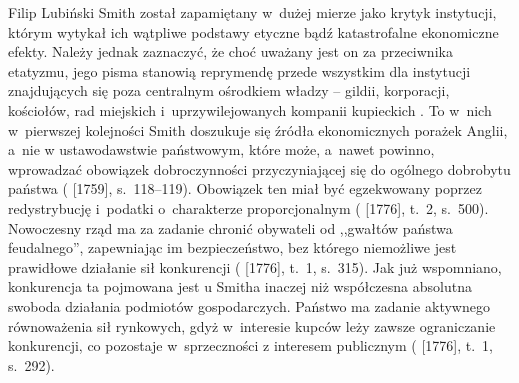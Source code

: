 \begin{artplenv}{Filip Lubiński}
Smith został zapamiętany w~dużej mierze jako krytyk instytucji, którym wytykał ich wątpliwe podstawy etyczne bądź
katastrofalne ekonomiczne efekty. Należy jednak zaznaczyć, że choć uważany jest on za przeciwnika etatyzmu, jego pisma
stanowią reprymendę przede wszystkim dla instytucji znajdujących się poza centralnym ośrodkiem władzy -- gildii,
korporacji, kościołów, rad miejskich i~uprzywilejowanych kompanii kupieckich
\parencite[s.~108]{rothschild_economic_2002}.
To w~nich w~pierwszej kolejności Smith doszukuje się źródła ekonomicznych porażek Anglii, a~nie w
ustawodawstwie państwowym, które może, a~nawet powinno, wprowadzać obowiązek dobroczynności przyczyniającej się do
ogólnego dobrobytu państwa
(\cite{smith_teoria_1989} [1759], s.~118--119).
Obowiązek ten miał być
egzekwowany poprzez redystrybucję i~podatki o~charakterze proporcjonalnym
(\cite{smith_badania_2007} [1776], t.~2, s.~500).
Nowoczesny rząd ma za zadanie chronić obywateli od ,,gwałtów państwa
feudalnego'', zapewniając im bezpieczeństwo, bez którego niemożliwe jest prawidłowe działanie sił konkurencji
(\cite{smith_badania_2007} [1776], t.~1, s.~315).
Jak już wspomniano, konkurencja ta pojmowana jest u
Smitha inaczej niż współczesna absolutna swoboda działania podmiotów gospodarczych. Państwo ma zadanie aktywnego
równoważenia sił rynkowych, gdyż w~interesie kupców leży zawsze ograniczanie konkurencji, co pozostaje w~sprzeczności z
interesem publicznym
(\cite{smith_badania_2007} [1776], t.~1, s.~292).


\end{artplenv}
